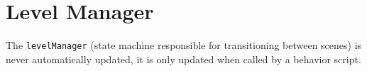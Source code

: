 \section{Level Manager}
The \texttt{levelManager} (state machine responsible for transitioning between scenes) is never automatically updated, it is only updated when called by a behavior script.